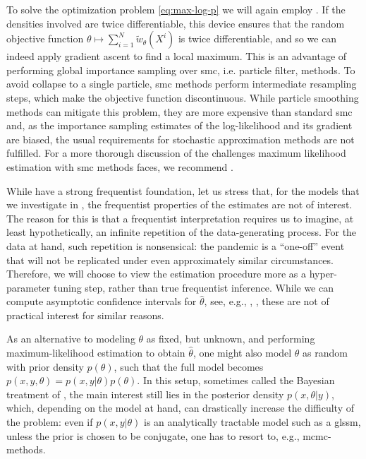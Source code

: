 To solve the optimization problem \eqref{eq:max-log-p} we will again employ . If the densities involved are twice differentiable, this device ensures that the random objective function $\theta \mapsto \sum_{i = 1}^N \tilde w_{\theta}(X^{i})$ is twice differentiable, and so we can indeed apply gradient ascent to find a local maximum. This is an advantage of performing global importance sampling over \acrshort{smc}, i.e. particle filter, methods. To avoid collapse to a single particle, \acrshort{smc} methods perform intermediate resampling steps, which make the objective function discontinuous. While particle smoothing methods can mitigate this problem, they are more expensive than standard \acrshort{smc} and, as the importance sampling estimates of the log-likelihood and its gradient are biased, the usual requirements for stochastic approximation methods are not fulfilled. 
For a more thorough discussion of the challenges maximum likelihood estimation with \acrshort{smc} methods faces, we recommend \citep[Chapter 14]{Chopin2020Introduction}.

While  have a strong frequentist foundation, let us stress that, for the models that we investigate in , the frequentist properties of the estimates are not of interest. The reason for this is that a frequentist interpretation requires us to imagine, at least hypothetically, an infinite repetition of the data-generating process. For the data at hand, such repetition is nonsensical: the pandemic is a ``{}one-off''{} event that will not be replicated under even approximately similar circumstances. Therefore, we will choose to view the estimation procedure more as a hyper-parameter tuning step, rather than true frequentist inference. While we can compute asymptotic confidence intervals for $\hat\theta$, see, e.g., \citep[Chapter 11.6]{Durbin2012Time}, \citep[Chapter 14.8]{Chopin2020Introduction}, these are not of practical interest for similar reasons. 

As an alternative to modeling $\theta$ as fixed, but unknown, and performing maximum-likelihood estimation to obtain $\hat \theta$, one might also model $\theta$ as random with prior density $p(\theta)$, such that the full model becomes $p(x,y,\theta) = p(x,y|\theta)p(\theta)$. In this setup, sometimes called the Bayesian treatment of  \citep[Section 13.1]{Durbin2012Time}, the main interest still lies in the posterior density $p(x,\theta|y)$, which, depending on the model at hand, can drastically increase the difficulty of the problem: even if $p(x,y|\theta)$ is an analytically tractable model such as a \acrshort{glssm}, unless the prior is chosen to be conjugate, one has to resort to, e.g., \acrshort{mcmc}-methods. 

